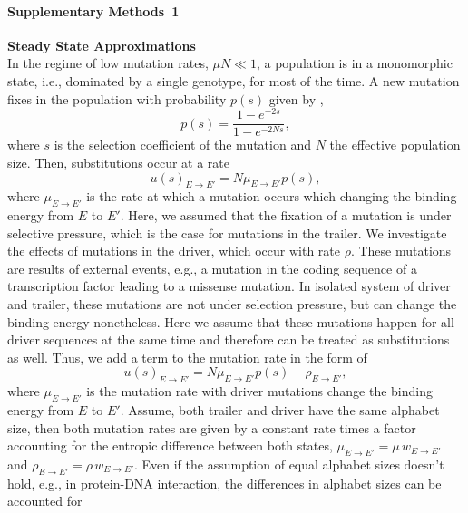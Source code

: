\documentclass[10pt,a4paper]{article}
\begin{document}
\paragraph*{Supplementary Methods~1}
\label{supp1}
\textbf{Steady State Approximations}\\

\noindent In the regime of low mutation rates, $\mu N\ll1$, a population is in a monomorphic state, i.e., dominated by a single genotype, 
for most of the time. A new mutation fixes in the population with probability $p(s)$ given by \cite{kimura_probability_1962},
\begin{equation}
p(s) = \frac{1-e^{-2s}}{1-e^{-2Ns}},
\end{equation}
where $s$ is the selection coefficient of the mutation and $N$ the effective population size. Then, substitutions occur at a rate
\begin{equation}
u(s)_{E\rightarrow E'} = N\mu_{E\rightarrow E'}p(s),
\end{equation}
where $\mu_{E\rightarrow E'}$ is the rate at which a mutation occurs which changing the binding energy from $E$ to $E'$. Here, we assumed that the fixation 
of a mutation is under selective pressure, which is the case for mutations in the trailer. We investigate the effects of mutations in the driver, which occur 
with rate $\rho$. These mutations are results of external events, e.g., a mutation in the coding sequence of a transcription factor leading to a missense mutation. 
In isolated system of driver and trailer, these mutations are not under selection pressure, but can change the binding energy nonetheless. 
Here we assume that these mutations happen for all driver sequences at the same time and therefore can be treated as substitutions as well. 
Thus, we add a term to the mutation rate in the form of
\begin{equation}
u(s)_{E\rightarrow E'}=   N\mu_{E\rightarrow E'}p(s) + \rho_{E\rightarrow E'},
\end{equation}
where $\mu_{E\rightarrow E'}$ is the mutation rate with driver mutations change the binding energy from $E$ to $E'$.
Assume, both trailer and driver have the same alphabet size, then both mutation rates are given by a constant rate times a factor accounting for 
the entropic difference between both states, $\mu_{E\rightarrow E'}=\mu\,w_{E\rightarrow E'}$ and $\rho_{E\rightarrow E'}=\rho\,w_{E\rightarrow E'}$. 
Even if the assumption of equal alphabet sizes doesn't hold, e.g., in protein-DNA interaction, the differences in alphabet sizes can be accounted for 
\end{document}
